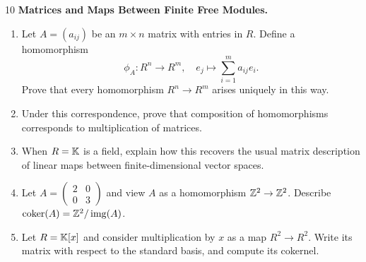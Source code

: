 \documentclass[Notebook.tex]{subfiles}
\begin{document}
    \begin{problem}{10}
        \textbf{Matrices and Maps Between Finite Free Modules.}
        \begin{enumerate}
        \item Let $A=(a_{ij})$ be an $m\times n$ matrix with entries in $R$. Define a homomorphism
        \[
        \phi_A:R^n\to R^m,
        \quad
        e_j\longmapsto \sum_{i=1}^m a_{ij}e_i.
        \]
        Prove that every homomorphism $R^n\to R^m$ arises uniquely in this way.
        \item Under this correspondence, prove that composition of homomorphisms corresponds to multiplication of matrices.
        \item When $R=\mathbb K$ is a field, explain how this recovers the usual matrix description of linear maps between finite-dimensional vector spaces.
        \item Let $A=\begin{pmatrix}2&0\\0&3\end{pmatrix}$ and view $A$ as a homomorphism $\mathbb Z^2\to \mathbb Z^2$. Describe $\operatorname{coker}(A)=\mathbb Z^2/\operatorname{img}(A)$.
        \item Let $R=\mathbb K[x]$ and consider multiplication by $x$ as a map $R^2\to R^2$. Write its matrix with respect to the standard basis, and compute its cokernel.
        \end{enumerate}
    \end{problem}
\end{document}
